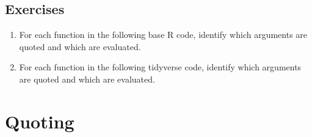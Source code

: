 \documentclass[]{book}
\newenvironment{Shaded}{\begin{snugshade}}{\end{snugshade}}
\newcommand{\DataTypeTok}[1]{\textcolor[rgb]{0.27,0.27,0.27}{#1}}
\newcommand{\DecValTok}[1]{\textcolor[rgb]{0.06,0.06,0.06}{#1}}
\newcommand{\KeywordTok}[1]{\textcolor[rgb]{0.27,0.27,0.27}{\textbf{#1}}}
\newcommand{\NormalTok}[1]{#1}
\newcommand{\OperatorTok}[1]{\textcolor[rgb]{0.43,0.43,0.43}{\textbf{#1}}}
\newcommand{\StringTok}[1]{\textcolor[rgb]{0.5,0.5,0.5}{#1}}
\begin{document}
\hypertarget{exercises-4}{%
\subsection{Exercises}\label{exercises-4}}

\begin{enumerate}
\def\labelenumi{\arabic{enumi}.}
\item
  For each function in the following base R code, identify which arguments
  are quoted and which are evaluated.

\begin{Shaded}
\end{Shaded}
\item
  For each function in the following tidyverse code, identify which arguments
  are quoted and which are evaluated.

\begin{Shaded}
\end{Shaded}
\end{enumerate}

\hypertarget{quoting}{%
\section{Quoting}\label{quoting}}
\end{document}
